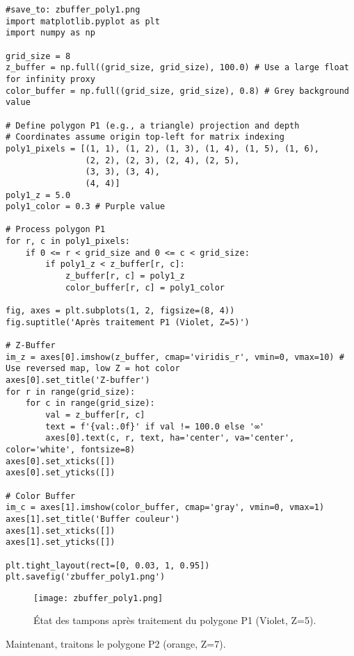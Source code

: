 \documentclass{article}
\begin{document}
\begin{verbatim}
#save_to: zbuffer_poly1.png
import matplotlib.pyplot as plt
import numpy as np

grid_size = 8
z_buffer = np.full((grid_size, grid_size), 100.0) # Use a large float for infinity proxy
color_buffer = np.full((grid_size, grid_size), 0.8) # Grey background value

# Define polygon P1 (e.g., a triangle) projection and depth
# Coordinates assume origin top-left for matrix indexing
poly1_pixels = [(1, 1), (1, 2), (1, 3), (1, 4), (1, 5), (1, 6),
                (2, 2), (2, 3), (2, 4), (2, 5),
                (3, 3), (3, 4),
                (4, 4)]
poly1_z = 5.0
poly1_color = 0.3 # Purple value

# Process polygon P1
for r, c in poly1_pixels:
    if 0 <= r < grid_size and 0 <= c < grid_size:
        if poly1_z < z_buffer[r, c]:
            z_buffer[r, c] = poly1_z
            color_buffer[r, c] = poly1_color

fig, axes = plt.subplots(1, 2, figsize=(8, 4))
fig.suptitle('Après traitement P1 (Violet, Z=5)')

# Z-Buffer
im_z = axes[0].imshow(z_buffer, cmap='viridis_r', vmin=0, vmax=10) # Use reversed map, low Z = hot color
axes[0].set_title('Z-buffer')
for r in range(grid_size):
    for c in range(grid_size):
        val = z_buffer[r, c]
        text = f'{val:.0f}' if val != 100.0 else '∞'
        axes[0].text(c, r, text, ha='center', va='center', color='white', fontsize=8)
axes[0].set_xticks([])
axes[0].set_yticks([])

# Color Buffer
im_c = axes[1].imshow(color_buffer, cmap='gray', vmin=0, vmax=1)
axes[1].set_title('Buffer couleur')
axes[1].set_xticks([])
axes[1].set_yticks([])

plt.tight_layout(rect=[0, 0.03, 1, 0.95])
plt.savefig('zbuffer_poly1.png')
\end{verbatim}

\begin{figure}[H]
\centering
\texttt{[image: zbuffer\_poly1.png]}
\caption{État des tampons après traitement du polygone P1 (Violet, Z=5).}
\label{fig:zbuffer_poly1}
\end{figure}

Maintenant, traitons le polygone P2 (orange, Z=7).
\end{document}
